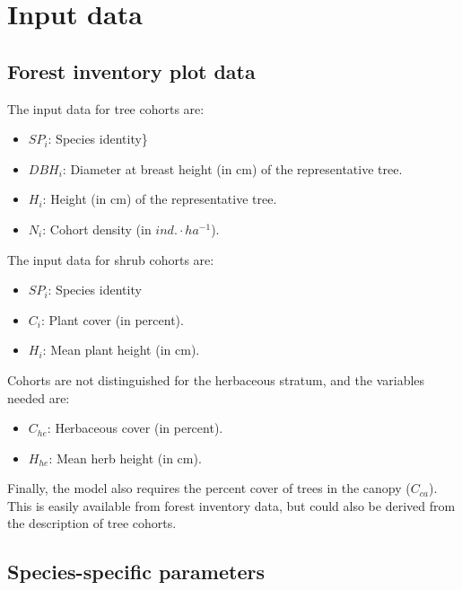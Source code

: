 \documentclass[]{book}
\providecommand{\tightlist}{%
  \setlength{\itemsep}{0pt}\setlength{\parskip}{0pt}}
\begin{document}
\section{Input data}\label{input-data-1}

\subsection{Forest inventory plot
data}\label{forest-inventory-plot-data}

The input data for tree cohorts are:

\begin{itemize}
\tightlist
\item
  \(SP_i\): Species identity\}
\item
  \(DBH_i\): Diameter at breast height (in cm) of the representative
  tree.
\item
  \(H_i\): Height (in cm) of the representative tree.
\item
  \(N_i\): Cohort density (in \(ind.\cdot ha^{-1}\)).
\end{itemize}

The input data for shrub cohorts are:

\begin{itemize}
\tightlist
\item
  \(SP_i\): Species identity
\item
  \(C_i\): Plant cover (in percent).
\item
  \(H_i\): Mean plant height (in cm).
\end{itemize}

Cohorts are not distinguished for the herbaceous stratum, and the
variables needed are:

\begin{itemize}
\tightlist
\item
  \(C_{he}\): Herbaceous cover (in percent).
\item
  \(H_{he}\): Mean herb height (in cm).
\end{itemize}

Finally, the model also requires the percent cover of trees in the
canopy (\(C_{ca}\)). This is easily available from forest inventory
data, but could also be derived from the description of tree cohorts.

\subsection{Species-specific
parameters}\label{species-specific-parameters}
\end{document}
